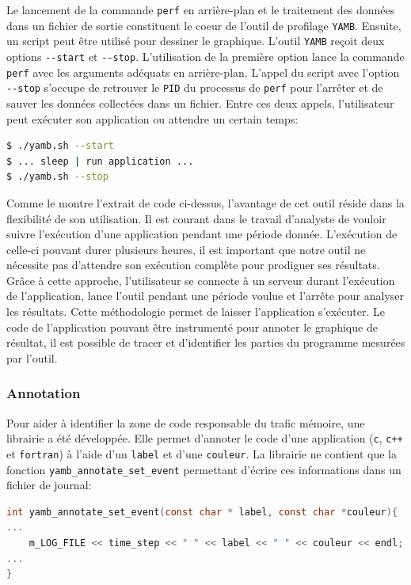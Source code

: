         Le lancement de la commande \verb=perf= en arrière-plan et le traitement des données dans un fichier de sortie constituent le coeur de l'outil de profilage \verb=YAMB=. Ensuite, un script peut être utilisé pour dessiner le graphique. 
        L'outil \verb=YAMB= reçoit deux options \verb=--start= et \verb=--stop=. L'utilisation de la première option lance la commande \verb|perf| avec les arguments adéquats en arrière-plan. L'appel du script avec l'option \verb=--stop= s'occupe de retrouver le \verb|PID| du processus de \verb|perf| pour l'arrêter et de sauver les données collectées dans un fichier. Entre ces deux appels, l'utilisateur peut exécuter son application ou attendre un certain temps:
\begin{lstlisting}[language=bash]
$ ./yamb.sh --start
$ ... sleep | run application ...
$ ./yamb.sh --stop
\end{lstlisting}
        Comme le montre l'extrait de code ci-dessus, l'avantage de cet outil réside dans la flexibilité de son utilisation. Il est courant dans le travail d'analyste de vouloir suivre l'exécution d'une application pendant une période donnée. L'exécution de celle-ci pouvant durer plusieurs heures, il est important que notre outil ne nécessite pas d'attendre son exécution complète pour prodiguer ses résultats. Grâce à cette approche, l'utilisateur se connecte à un serveur durant l'exécution de l'application, lance l'outil pendant une période voulue et l'arrête pour analyser les résultats. Cette méthodologie permet de laisser l'application s'exécuter. Le code de l'application pouvant être instrumenté pour annoter le graphique de résultat, il est possible de tracer et d'identifier les parties du programme mesurées par l'outil.
        

    \subsubsection{Annotation}

        Pour aider à identifier la zone de code responsable du trafic mémoire, une librairie a été développée. Elle permet d'annoter le code d'une application (\verb=c=, \verb=c++= et \verb=fortran=) à l'aide d'un \verb=label= et d'une \verb=couleur=. La librairie ne contient que la fonction \verb=yamb_annotate_set_event= permettant d'écrire ces informations dans un fichier de journal:
\begin{lstlisting}[label=lst:yamb_api ,language=C]
int yamb_annotate_set_event(const char * label, const char *couleur){
...
    m_LOG_FILE << time_step << " " << label << " " << couleur << endl;
...
}
\end{lstlisting}


